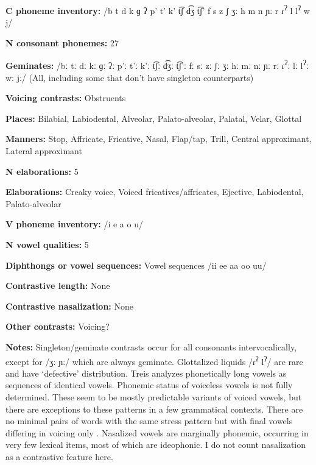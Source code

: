 \textbf{C phoneme inventory:} /b t d k ɡ ʔ p’ t’ k’ t͡ʃ d͡ʒ t͡ʃ’ f s z ʃ ʒː h m n ɲː r ɾ\textsuperscript{ʔ} l l\textsuperscript{ʔ} w j/



\textbf{N consonant phonemes:} 27



\textbf{Geminates:} /bː tː dː kː ɡː ʔː p’ː t’ː k’ː t͡ʃː d͡ʒː t͡ʃ’ː fː sː zː ʃː ʒː hː mː nː ɲː rː ɾ\textsuperscript{ʔ}ː lː l\textsuperscript{ʔ}ː wː jː/ (All, including some that don’t have singleton counterparts)



\textbf{Voicing contrasts:} Obstruents



\textbf{Places:} Bilabial, Labiodental, Alveolar, Palato-alveolar, Palatal, Velar, Glottal



\textbf{Manners:} Stop, Affricate, Fricative, Nasal, Flap/tap, Trill, Central approximant, Lateral approximant



\textbf{N elaborations:} 5



\textbf{Elaborations:} Creaky voice, Voiced fricatives/affricates, Ejective, Labiodental, Palato-alveolar



\textbf{V phoneme inventory:} /i e a o u/



\textbf{N vowel qualities:} 5



\textbf{Diphthongs or vowel sequences:} Vowel sequences /ii ee aa oo uu/



\textbf{Contrastive length:} None



\textbf{Contrastive nasalization:} None



\textbf{Other contrasts:} Voicing?



\textbf{Notes:} Singleton/geminate contrasts occur for all consonants intervocalically, except for /ʒː ɲː/ which are always geminate. Glottalized liquids /ɾ\textsuperscript{ʔ} l\textsuperscript{ʔ}/ are rare and have ‘defective’ distribution. Treis analyzes phonetically long vowels as sequences of identical vowels. Phonemic status of voiceless vowels is not fully determined. These seem to be mostly predictable variants of voiced vowels, but there are exceptions to these patterns in a few grammatical contexts. There are no minimal pairs of words with the same stress pattern but with final vowels differing in voicing only \citep[20-22]{Treis2008}. Nasalized vowels are marginally phonemic, occurring in very few lexical items, most of which are ideophonic. I do not count nasalization as a contrastive feature here.



